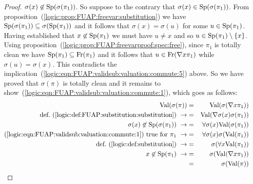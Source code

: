 \begin{proof}
$\sigma(x)\not\in\mbox{\rm Sp}(\sigma(\pi_{1}))$. So suppose to the contrary
that $\sigma(x)\in\mbox{\rm Sp}(\sigma(\pi_{1}))$. From
proposition~(\ref{logic:prop:FUAP:freevar:substitution}) we have
$\mbox{\rm Sp}(\sigma(\pi_{1}))\subseteq\sigma(\mbox{\rm Sp}(\pi_{1}))$ and it
follows that $\sigma(x)=\sigma(u)$ for some $u\in\mbox{\rm Sp}(\pi_{1})$.
Having established that $x\not\in\mbox{\rm Sp}(\pi_{1})$ we must have $u\neq
x$ and so $u\in\mbox{\rm Sp}(\pi_{1})\setminus\{x\}$. Using
proposition~(\ref{logic:prop:FUAP:freevarproof:spec:free}), since
$\pi_{1}$ is totally clean we have
$\mbox{\rm Sp}(\pi_{1})\subseteq\mbox{\rm Fr}(\pi_{1})$ and it follows that
$u\in\mbox{\rm Fr}(\mbox{$\nabla$} x\pi_{1})$ while $\sigma(u)=\sigma(x)$. This
contradicts the
implication~(\ref{logic:eqn:FUAP:validsub:valuation:commute:5})
above. So we have proved that $\sigma(\pi)$ is totally clean and it
remains to show~(\ref{logic:eqn:FUAP:validsub:valuation:commute:1}),
which goes as follows:
    \begin{eqnarray*}
    \val(\sigma(\pi))&=&\val(\sigma(\gen x\pi_{1}))\\
    \mbox{def.~(\ref{logic:def:FUAP:substitution:substitution})}\ \rightarrow
    &=&\val(\gen\sigma(x)\sigma(\pi_{1}))\\
    \sigma(x)\not\in\spec(\sigma(\pi_{1}))\ \rightarrow
    &=&\forall\sigma(x)\val(\sigma(\pi_{1}))\\
    \mbox{(\ref{logic:eqn:FUAP:validsub:valuation:commute:1}) true for $\pi_{1}$}\ \rightarrow
    &=&\forall\sigma(x)\sigma(\val(\pi_{1}))\\
    \mbox{def.~(\ref{logic:def:substitution})}\ \rightarrow
    &=&\sigma(\forall x\val(\pi_{1}))\\
    x\not\in\spec(\pi_{1})\ \rightarrow
    &=&\sigma(\val(\gen x\pi_{1}))\\
    &=&\sigma(\val(\pi))\\
    \end{eqnarray*}
\end{proof}

